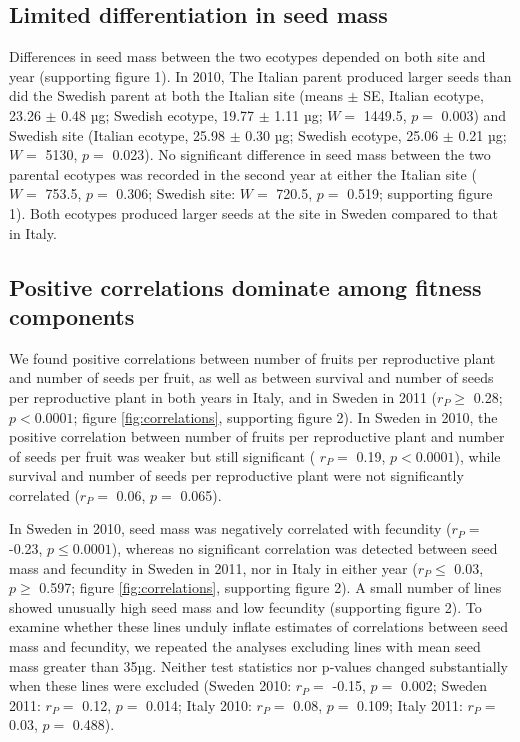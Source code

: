 \documentclass[12pt,]{article}
\begin{document}
\hypertarget{limited-differentiation-in-seed-mass}{%
\subsection{Limited differentiation in seed mass}\label{limited-differentiation-in-seed-mass}}

Differences in seed mass between the two ecotypes depended on both site and year (supporting figure 1).
In 2010, The Italian parent produced larger seeds than did the Swedish parent at both the Italian site
(means \(\pm\) SE, Italian ecotype,
23.26
\(\pm\)
0.48
µg; Swedish ecotype,
19.77
\(\pm\)
1.11
µg;
\(W =\) 1449.5,
\(p=\) 0.003)
and Swedish site
(Italian ecotype,
25.98
\(\pm\)
0.30
µg; Swedish ecotype,
25.06
\(\pm\)
0.21
µg;
\(W =\) 5130,
\(p=\) 0.023).
No significant difference in seed mass between the two parental ecotypes was recorded in the second year at either the Italian site
(
\(W =\) 753.5, \(p=\) 0.306;
Swedish site:
\(W =\) 720.5, \(p=\) 0.519;
supporting figure 1).
Both ecotypes produced larger seeds at the site in Sweden compared to that in Italy.

\hypertarget{positive-correlations-dominate-among-fitness-components}{%
\subsection{Positive correlations dominate among fitness components}\label{positive-correlations-dominate-among-fitness-components}}

We found positive correlations between number of fruits per reproductive plant and number of seeds per fruit, as well as between survival and number of seeds per reproductive plant in both years in Italy, and in Sweden in 2011 (\(r_P \geq\)
0.28;
\(p < 0.0001\);
figure \ref{fig:correlations}, supporting figure 2).
In Sweden in 2010, the positive correlation between number of fruits per reproductive plant and number of seeds per fruit was weaker but still significant (
\(r_P=\) 0.19,
\(p<0.0001\)),
while survival and number of seeds per reproductive plant were not significantly correlated
(\(r_P=\) 0.06,
\(p=\) 0.065).

In Sweden in 2010, seed mass was negatively correlated with fecundity
(\(r_P=\) -0.23,
\(p \leq 0.0001\)),
whereas no significant correlation was detected between seed mass and fecundity in Sweden in 2011, nor in Italy in either year
(\(r_P \leq\) 0.03,
\(p \geq\) 0.597;
figure \ref{fig:correlations}, supporting figure 2).
A small number of lines showed unusually high seed mass and low fecundity (supporting figure 2).
To examine whether these lines unduly inflate estimates of correlations between seed mass and fecundity, we repeated the analyses excluding lines with mean seed mass greater than 35µg.
Neither test statistics nor p-values changed substantially when these lines were excluded
(Sweden 2010: \(r_P=\) -0.15, \(p=\) 0.002;
Sweden 2011: \(r_P=\) 0.12, \(p=\) 0.014;
Italy 2010: \(r_P=\) 0.08, \(p=\) 0.109;
Italy 2011: \(r_P=\) 0.03, \(p=\) 0.488).
\end{document}
